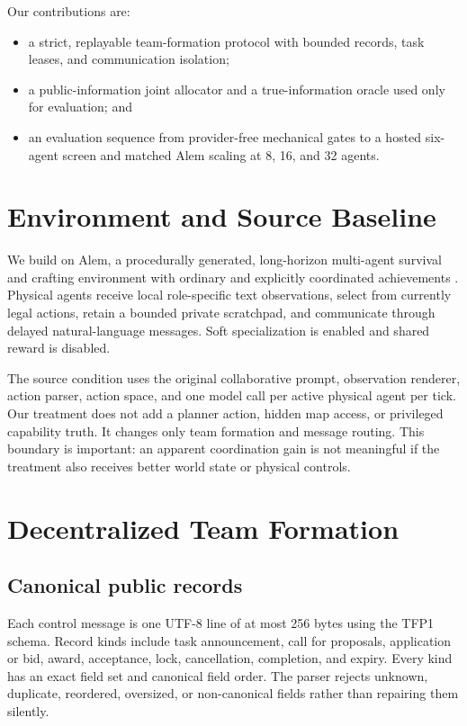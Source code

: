 \documentclass[letterpaper]{article} %
\begin{document}
Our contributions are:
\begin{itemize}
    \item a strict, replayable team-formation protocol with bounded records,
    task leases, and communication isolation;
    \item a public-information joint allocator and a true-information oracle
    used only for evaluation; and
    \item an evaluation sequence from provider-free mechanical gates to a
    hosted six-agent screen and matched Alem scaling at 8, 16, and 32 agents.
\end{itemize}

\section{Environment and Source Baseline}

We build on Alem, a procedurally generated, long-horizon multi-agent survival
and crafting environment with ordinary and explicitly coordinated
achievements \citep{tessera2026alem}.  Physical agents receive local
role-specific text observations, select from currently legal actions, retain a
bounded private scratchpad, and communicate through delayed natural-language
messages.  Soft specialization is enabled and shared reward is disabled.

The source condition uses the original collaborative prompt, observation
renderer, action parser, action space, and one model call per active physical
agent per tick.  Our treatment does not add a planner action, hidden map access,
or privileged capability truth.  It changes only team formation and message
routing.  This boundary is important: an apparent coordination gain is not
meaningful if the treatment also receives better world state or physical
controls.

\section{Decentralized Team Formation}

\subsection{Canonical public records}

Each control message is one UTF-8 line of at most 256 bytes using the TFP1
schema.  Record kinds include task announcement, call for proposals,
application or bid, award, acceptance, lock, cancellation, completion, and
expiry.  Every kind has an exact field set and canonical field order.  The
parser rejects unknown, duplicate, reordered, oversized, or non-canonical
fields rather than repairing them silently.
\end{document}
